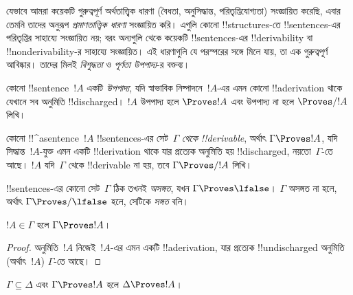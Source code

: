 \documentclass[../../../include/open-logic-section]{subfiles}
\begin{document}
      {}
      {}



\begin{explain}
যেভাবে আমরা কয়েকটি গুরুত্বপূর্ণ অর্থতাত্ত্বিক ধারণা (বৈধতা,
অনুসিদ্ধান্ত, পরিতৃপ্তিযোগ্যতা) সংজ্ঞায়িত করেছি, এবার তেমনি তাদের
অনুরূপ \emph{প্রমাণতাত্ত্বিক ধারণা} সংজ্ঞায়িত করি। এগুলি কোনো
!!{structure}s-তে !!{sentence}s-এর পরিতৃপ্তির সাহায্যে সংজ্ঞায়িত নয়;
বরং অন্যগুলি থেকে কয়েকটি !!{sentence}s-এর !!{derivability} বা
!!{nonderivability}-র সাহায্যে সংজ্ঞায়িত। এই ধারণাগুলি যে পরস্পরের
সঙ্গে মিলে যায়, তা এক গুরুত্বপূর্ণ আবিষ্কার। তাদের মিলই
\emph{বিশুদ্ধতা} ও \emph{পূর্ণতা উপপাদ্য}-র বক্তব্য।
\end{explain}


\begin{defn}[উপপাদ্য]
কোনো !!{sentence}~$!A$ একটি \emph{উপপাদ্য}, যদি স্বাভাবিক
নিষ্পাদনে~$!A$-এর এমন কোনো !!a{derivation} থাকে যেখানে সব অনুমিতি
!!{discharged}। $!A$ উপপাদ্য হলে $\Proves !A$ এবং উপপাদ্য না হলে
$\Proves/ !A$ লিখি।
\end{defn}

\begin{defn}[!!^{derivability}]
কোনো !!^a{sentence}~$!A$ !!{sentence}s-এর সেট~$\Gamma$ \emph{থেকে
!!{derivable}}, অর্থাৎ $\Gamma \Proves !A$, যদি সিদ্ধান্ত~$!A$-যুক্ত
এমন একটি !!{derivation} থাকে যার প্রত্যেক অনুমিতি হয় !!{discharged},
নয়তো~$\Gamma$-তে আছে। $!A$ যদি~$\Gamma$ থেকে !!{derivable} না হয়,
তবে $\Gamma \Proves/ !A$ লিখি।
\end{defn}

\begin{defn}[সঙ্গতি]
!!{sentence}s-এর কোনো সেট~$\Gamma$ ঠিক তখনই \emph{অসঙ্গত}, যখন
$\Gamma \Proves \lfalse$। $\Gamma$ অসঙ্গত না হলে, অর্থাৎ $\Gamma
\Proves/ \lfalse$ হলে, সেটিকে \emph{সঙ্গত} বলি।
\end{defn}

\begin{prop}[প্রতিবিম্ব ধর্ম]
$!A \in \Gamma$ হলে $\Gamma \Proves !A$।
\end{prop}

\begin{proof}
অনুমিতি~$!A$ নিজেই~$!A$-এর এমন একটি !!a{derivation}, যার প্রত্যেক
!!{undischarged} অনুমিতি (অর্থাৎ~$!A$) $\Gamma$-তে আছে।
\end{proof}


\begin{prop}[একঘেয়েতা]
$\Gamma \subseteq \Delta$ এবং $\Gamma \Proves !A$ হলে $\Delta
\Proves !A$।
\end{prop}
\end{document}
